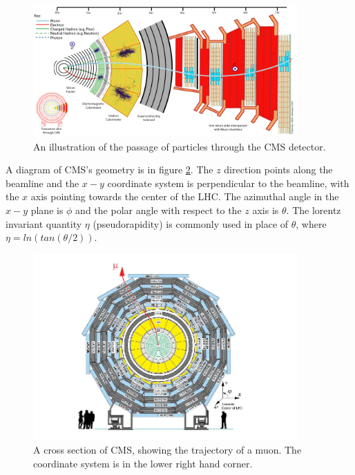 \documentclass[oneside, letterpaper, oldfontcommands]{memoir}
\begin{document}
\begin{figure}[here]
\includegraphics[width=0.9\textwidth]{CMS_SLICE.png}
\caption{An illustration of the passage of particles through the CMS detector. \cite{CMS_SLICE}}
\label{fig:cmsxsec}
\end{figure}

\qquad A diagram of CMS's geometry is in figure \ref{fig:cmscoord}. The $z$ direction points along the beamline and the $x-y$ coordinate system is perpendicular to the beamline, with the $x$ axis pointing towards the center of the LHC. The azimuthal angle in the $x-y$ plane is $\phi$ and the polar angle with respect to the $z$ axis is $\theta$. The lorentz invariant quantity $\eta$ (pseudorapidity) is commonly used in place of $\theta$, where $\eta = ln(tan(\theta/2))$.

\begin{figure}[here]
\includegraphics[width=0.9\textwidth]{CMSview.png}
\caption{A cross section of CMS, showing the trajectory of a muon. The coordinate system is in the lower right hand corner. \cite{Chatrchyan:2009hg}}
\label{fig:cmscoord}
\end{figure}
\end{document}
